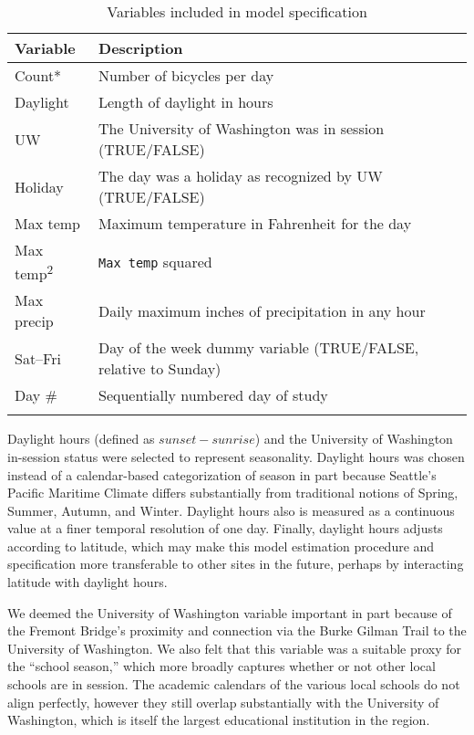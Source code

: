 \documentclass[12pt,letterpaper,article]{memoir}
\begin{document}
\begin{table}[ht!]
\begin{center}
\begin{scriptsize}
\caption{Variables included in model specification}
\begin{tabularx}{0.7\textwidth}{>{\raggedright\arraybackslash}p{1.6cm}>{\raggedright\arraybackslash}X}
\toprule
Variable & Description \\
\midrule
Count* & Number of bicycles per day \\
Daylight  & Length of daylight in hours \\
UW & The University of Washington was in session (TRUE/FALSE) \\
Holiday & The day was a holiday as recognized by UW (TRUE/FALSE) \\
Max temp & Maximum temperature in Fahrenheit for the day \\
Max temp\textsuperscript{2} & \texttt{Max temp} squared \\
Max precip & Daily maximum inches of precipitation in any hour \\
Sat--Fri & Day of the week dummy variable (TRUE/FALSE, relative to Sunday) \\
Day \# & Sequentially numbered day of study \\
\bottomrule
\multicolumn{2}{r}{* Dependent variable}
\end{tabularx}

\label{tb:variables}
\end{scriptsize}
\end{center}
\end{table}


Daylight hours (defined as $sunset - sunrise$) and the University of
Washington in-session status were selected to represent seasonality.
Daylight hours was chosen instead of a calendar-based categorization
of season in part because Seattle's Pacific Maritime Climate differs
substantially from traditional notions of Spring, Summer, Autumn, and
Winter. Daylight hours also is measured as a continuous value at a
finer temporal resolution of one day. Finally, daylight hours adjusts
according to latitude, which may make this model estimation procedure
and specification more transferable to other sites in the future,
perhaps by interacting latitude with daylight hours.

We deemed the University of Washington variable important in part
because of the Fremont Bridge's proximity and connection via the Burke
Gilman Trail to the University of Washington. We also felt that this
variable was a suitable proxy for the ``school season,'' which more
broadly captures whether or not other local schools are in session.
The academic calendars of the various local schools do not align
perfectly, however they still overlap substantially with the
University of Washington, which is itself the largest educational
institution in the region.
\end{document}

